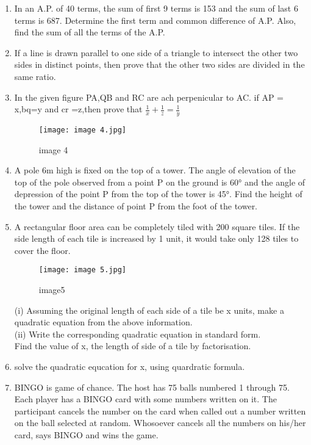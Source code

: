 \documentclass{article}
\begin{document}
\begin{enumerate}
\item In an A.P. of 40 terms, the sum of first 9 terms is 153 and the sum of last 6 terms is 687. Determine the first term and common difference of A.P. Also, find the sum of all the terms of the A.P.
\item If a line is drawn parallel to one side of a triangle to intersect the other two sides in distinct points, then prove that the other two sides are divided in the same ratio.
\item In the given figure PA,QB and RC are ach perpenicular to AC. if AP = x,bq=y and cr =z,then prove that $\frac{1}{x} + \frac{1}{z} = \frac{1}{y}$                                               
\begin{figure}[h!]
\centering
\texttt{[image: image 4.jpg]}
\label{fig:image 4}
\caption{image 4}
\end{figure}
\newpage
\item A pole 6m high is fixed on the top of a tower. The angle of elevation of the top of the pole observed from a point P on the ground is 60° and the angle of depression of the point P from the top of the tower is 45°. Find the height of the tower and the distance of point P from the foot of the tower.
\item A rectangular floor area can be completely tiled with 200 square tiles. If the side length of each tile is increased by 1 unit, it would take only 128 tiles to cover the floor.

\begin{figure}[h!]
\centering
\texttt{[image: image 5.jpg]}
\label{fig:image5}
	\caption{image5} 
\end{figure}
(i) Assuming the original length of each side of a tile be x units, make a quadratic equation from the above information.\\
(ii) Write the corresponding quadratic equation in standard form.\\
 Find the value of x, the length of side of a tile by factorisation.
\item solve the quadratic equcation for x, using quardratic formula.
\newpage
\item BINGO is game of chance. The host has 75 balls numbered 1 through 75. Each player has a BINGO card with some numbers written on it.
The participant cancels the number on the card when called out a number written on the ball selected at random. Whosoever cancels all the numbers on his/her card, says BINGO and wins the game.


\end{enumerate}
\end{document}

